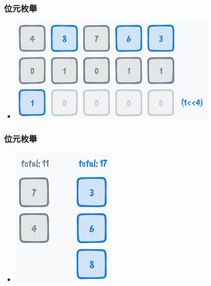 \documentclass{beamer}
\begin{document}
\begin{frame}
    \frametitle{位元枚舉}
    \begin{itemize}
        \item \includegraphics[width=10.0cm]{img/img_9.png}
    \end{itemize}
\end{frame}

\begin{frame}
    \frametitle{位元枚舉}
    \begin{itemize}
        \item \includegraphics[width=5.0cm]{img/img_10.png}
    \end{itemize}
\end{frame}
\end{document}
